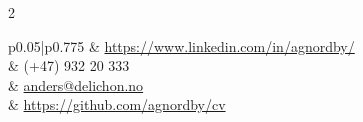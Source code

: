 \documentclass[10pt]{article} %
\begin{document}
\begin{paracol}{2}
\vspace{-\baselineskip}\medskip %
\switchcolumn %


\parbox[top][0.12\textheight][c]{\linewidth}{ %
	\vspace{-0.04\textheight} %
	\colorbox{shade}{ %
		\begin{supertabular}{p{0.05\linewidth}|p{0.775\linewidth}} %
			\raisebox{-1pt}{\faLinkedinSquare} & \href{https://www.linkedin.com/in/agnordby/}{https://www.linkedin.com/in/agnordby/} \\ %
			\raisebox{-1pt}{\faPhone} & (+47) 932 20 333 \\ %
			\raisebox{0pt}{\small\faEnvelope} & \href{mailto:anders@delichon.no}{anders@delichon.no} \\ %
			\raisebox{-1pt}{\faGithub} & \href{https://https://github.com/agnordby/cv}{https://github.com/agnordby/cv} \\ %

		\end{supertabular}
	}
}



\end{paracol}
\end{document}
